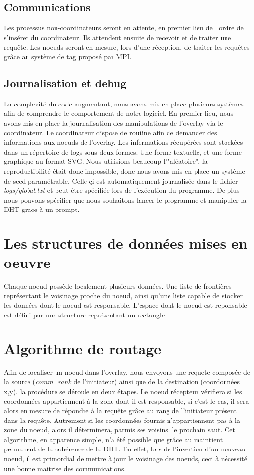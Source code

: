 \documentclass[a4paper, 11pt, french]{article}
\begin{document}
\subsection{Communications}
Les processus non-coordinateurs seront en attente, en premier lieu de l'ordre de s'insérer du coordinateur. Ils attendent ensuite de recevoir et de traiter une requête. Les noeuds seront en mesure, lors d'une réception, de traiter les requêtes grâce au système de tag proposé par MPI.
\subsection{Journalisation et debug}
La complexité du code augmentant, nous avons mis en place plusieurs systèmes afin de comprendre le comportement de notre logiciel. En premier lieu, nous avons mis en place la journalisation des manipulations de l'overlay via le coordinateur. Le coordinateur dispose de routine afin de demander des informations aux noeuds de l'overlay. Les informations récupérées sont stockées dans un répertoire de logs sous deux formes. Une forme textuelle, et une forme graphique au format SVG. Nous utilisions beaucoup l'"aléatoire", la reproductibilité était donc impossible, donc nous avons mis en place un système de seed paramétrable. Celle-çi est automatiquement journalisée dans le fichier \textit{logs/global.txt} et peut être spécifiée lors de l'exécution du programme. De plus nous pouvons spécifier que nous souhaitons lancer le programme et manipuler la DHT grace à un prompt.

\section {Les structures de données mises en oeuvre}
Chaque noeud possède localement plusieurs données. Une liste de frontières représentant le voisinage proche du noeud, ainsi qu'une liste capable de stocker les données dont le noeud est responsable. L'espace dont le noeud est reponsable est défini par une structure représentant un rectangle.

\section{Algorithme de routage}
Afin de localiser un noeud dans l'overlay, nous envoyons une requete composée de la source (\textit{comm\_rank} de l'initiateur) ainsi que de la destination (coordonnées x,y). la procédure se déroule en deux étapes. Le noeud récepteur vérifiera si les coordonnées appartiennent à la zone dont il est responsable, si c'est le cas, il sera alors en mesure de répondre à la requête grâce au rang de l'initiateur présent dans la requête. Autrement si les coordonnées fournis n'appartiennent pas à la zone du noeud, alors il déterminera, parmis ses voisins, le prochain saut.
Cet algorithme, en apparence simple, n'a été possible que grâce au maintient permanent de la cohérence de la DHT. En effet, lors de l'insertion d'un nouveau noeud, il est primordial de mettre à jour le voisinage des noeuds, ceci à nécessité une bonne maitrise des communications.
\end{document}

